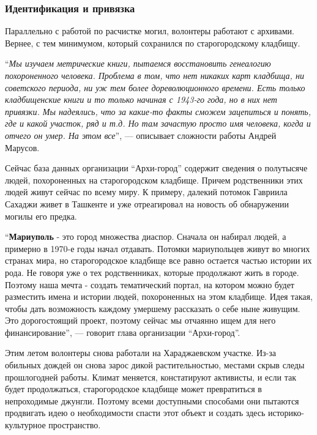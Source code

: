 
\subsubsection{Идентификация и привязка}

Параллельно с работой по расчистке могил, волонтеры работают с архивами.
Вернее, с тем минимумом, который сохранился по старогородскому кладбищу.

\enquote{\em Мы изучаем метрические книги, пытаемся восстановить генеалогию похороненного
человека. Проблема в том, что нет никаких карт кладбища, ни советского периода,
ни уж тем более дореволюционного времени. Есть только кладбищенские книги и то
только начиная с 1943-го года, но в них нет привязки. Мы надеялись, что за
какие-то факты сможем зацепиться и понять, где и какой участок, ряд и т.д. Но
там зачастую просто имя человека, когда и отчего он умер. На этом все}, —
описывает сложности работы Андрей Марусов.


Сейчас база данных организации \enquote{Архи-город} содержит сведения о полутысяче
людей, похороненных на старогородском кладбище. Причем родственники этих людей
живут сейчас по всему миру. К примеру, далекий потомок Гавриила Сахаджи живет в
Ташкенте и уже отреагировал на новость об обнаружении могилы его предка.

\enquote{\textbf{Мариуполь} - это город множества диаспор. Сначала он набирал людей, а примерно
в 1970-е годы начал отдавать. Потомки мариупольцев живут во многих странах
мира, но старогородское кладбище все равно остается частью истории их рода. Не
говоря уже о тех родственниках, которые продолжают жить в городе. Поэтому наша
мечта - создать тематический портал, на котором можно будет разместить имена и
истории людей, похороненных на этом кладбище. Идея такая, чтобы дать
возможность каждому умершему рассказать о себе ныне живущим. Это дорогостоящий
проект, поэтому сейчас мы отчаянно ищем для него финансирование}, — говорит
глава организации \enquote{Архи-город}.


Этим летом волонтеры снова работали на Хараджаевском участке. Из-за обильных
дождей он снова зарос дикой растительностью, местами скрыв следы прошлогодней
работы. Климат меняется, констатируют активисты, и если так будет продолжаться,
старогородское кладбище может превратиться в непроходимые джунгли. Поэтому
всеми доступными способами они пытаются продвигать идею о необходимости спасти
этот объект и создать здесь историко-культурное пространство.
